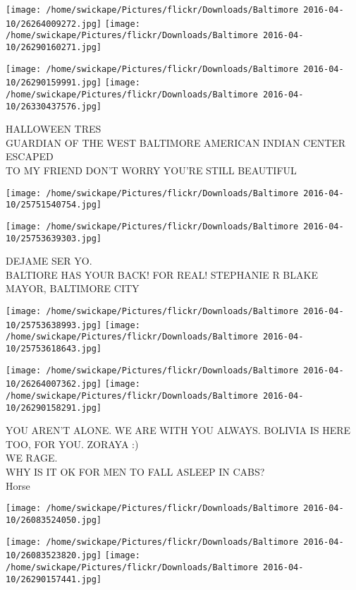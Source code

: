 \documentclass[10pt,letterpaper]{article}
\begin{document}
\texttt{[image: /home/swickape/Pictures/flickr/Downloads/Baltimore 2016-04-10/26264009272.jpg]}
\texttt{[image: /home/swickape/Pictures/flickr/Downloads/Baltimore 2016-04-10/26290160271.jpg]}

\texttt{[image: /home/swickape/Pictures/flickr/Downloads/Baltimore 2016-04-10/26290159991.jpg]}
\texttt{[image: /home/swickape/Pictures/flickr/Downloads/Baltimore 2016-04-10/26330437576.jpg]}

HALLOWEEN TRES\\
GUARDIAN OF THE WEST BALTIMORE AMERICAN INDIAN CENTER\\
ESCAPED\\
TO MY FRIEND DON'T WORRY YOU'RE STILL BEAUTIFUL
\pagebreak

\texttt{[image: /home/swickape/Pictures/flickr/Downloads/Baltimore 2016-04-10/25751540754.jpg]}

\vspace{0.25in}
\texttt{[image: /home/swickape/Pictures/flickr/Downloads/Baltimore 2016-04-10/25753639303.jpg]}

DEJAME SER YO.\\
BALTIORE HAS YOUR BACK!  FOR REAL!  STEPHANIE R BLAKE MAYOR, BALTIMORE CITY
\pagebreak

\texttt{[image: /home/swickape/Pictures/flickr/Downloads/Baltimore 2016-04-10/25753638993.jpg]}
\texttt{[image: /home/swickape/Pictures/flickr/Downloads/Baltimore 2016-04-10/25753618643.jpg]}

\texttt{[image: /home/swickape/Pictures/flickr/Downloads/Baltimore 2016-04-10/26264007362.jpg]}
\texttt{[image: /home/swickape/Pictures/flickr/Downloads/Baltimore 2016-04-10/26290158291.jpg]}

YOU AREN'T ALONE.  WE ARE WITH YOU ALWAYS.  BOLIVIA IS HERE TOO, FOR YOU.  ZORAYA :)\\
WE RAGE.\\
WHY IS IT OK FOR MEN TO FALL ASLEEP IN CABS?\\
Horse
\pagebreak

\texttt{[image: /home/swickape/Pictures/flickr/Downloads/Baltimore 2016-04-10/26083524050.jpg]}

\vspace{0.25in}
\texttt{[image: /home/swickape/Pictures/flickr/Downloads/Baltimore 2016-04-10/26083523820.jpg]}
\texttt{[image: /home/swickape/Pictures/flickr/Downloads/Baltimore 2016-04-10/26290157441.jpg]}
\end{document}
